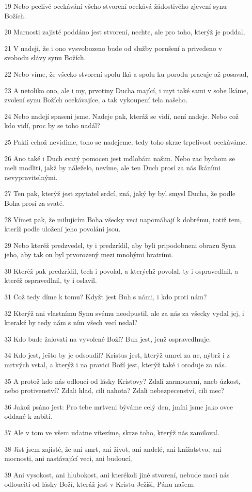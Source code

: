 \par 19 Nebo peclivé ocekávání všeho stvorení ocekává žádostivého zjevení synu Božích.
\par 20 Marnosti zajisté poddáno jest stvorení, nechte, ale pro toho, kterýž je poddal,
\par 21 V nadeji, že i ono vysvobozeno bude od služby porušení a privedeno v svobodu slávy synu Božích.
\par 22 Nebo víme, že všecko stvorení spolu lká a spolu ku porodu pracuje až posavad,
\par 23 A netoliko ono, ale i my, prvotiny Ducha mající, i myt také sami v sobe lkáme, zvolení synu Božích ocekávajíce, a tak vykoupení tela našeho.
\par 24 Nebo nadejí spaseni jsme. Nadeje pak, kteráž se vidí, není nadeje. Nebo což kdo vidí, proc by se toho nadál?
\par 25 Pakli cehož nevidíme, toho se nadejeme, tedy toho skrze trpelivost ocekáváme.
\par 26 Ano také i Duch svatý pomocen jest mdlobám našim. Nebo zac bychom se meli modliti, jakž by náleželo, nevíme, ale ten Duch prosí za nás lkáními nevypravitelnými.
\par 27 Ten pak, kterýž jest zpytatel srdcí, zná, jaký by byl smysl Ducha, že podle Boha prosí za svaté.
\par 28 Vímet pak, že milujícím Boha všecky veci napomáhají k dobrému, totiž tem, kteríž podle uložení jeho povoláni jsou.
\par 29 Nebo kteréž predzvedel, ty i predzrídil, aby byli pripodobneni obrazu Syna jeho, aby tak on byl prvorozený mezi mnohými bratrími.
\par 30 Kteréž pak predzrídil, tech i povolal, a kterýchž povolal, ty i ospravedlnil, a kteréž ospravedlnil, ty i oslavil.
\par 31 Což tedy díme k tomu? Kdyžt jest Buh s námi, i kdo proti nám?
\par 32 Kterýž ani vlastnímu Synu svému neodpustil, ale za nás za všecky vydal jej, i kterakž by tedy nám s ním všech vecí nedal?
\par 33 Kdo bude žalovati na vyvolené Boží? Buh jest, jenž ospravedlnuje.
\par 34 Kdo jest, ješto by je odsoudil? Kristus jest, kterýž umrel za ne, nýbrž i z mrtvých vstal, a kterýž i na pravici Boží jest, kterýž také i oroduje za nás.
\par 35 A protož kdo nás odloucí od lásky Kristovy? Zdali zarmoucení, aneb úzkost, nebo protivenství? Zdali hlad, cili nahota? Zdali nebezpecenství, cili mec?
\par 36 Jakož psáno jest: Pro tebe mrtveni býváme celý den, jmíni jsme jako ovce oddané k zabití.
\par 37 Ale v tom ve všem udatne vítezíme, skrze toho, kterýž nás zamiloval.
\par 38 Jist jsem zajisté, že ani smrt, ani život, ani andelé, ani knížatstvo, ani mocnosti, ani nastávající veci, ani budoucí,
\par 39 Ani vysokost, ani hlubokost, ani kterékoli jiné stvorení, nebude moci nás odlouciti od lásky Boží, kteráž jest v Kristu Ježíši, Pánu našem.

